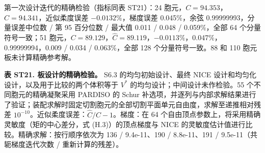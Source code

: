 \documentclass[preprint,12pt,authoryear]{elsarticle}
\begin{document}
第一次设计迭代的精确检验（指标同表 ST21）：24 胞元，\(C=94.353\)，\(\widehat C=94.341\)，近似柔度误差 \(-0.0132\%\)，梯度误差 0.045\%，余弦 0.99999993，分量误差中位数 / 第 95 百分位数 / 最大值 0.011 / 0.048 / 0.059\%，全部 64 个分量符号一致；51 胞元，\(C=89.129\)，\(\widehat C=89.119\)，\(-0.0113\%\)，0.047\%，0.99999994，0.009 / 0.034 / 0.063\%，全部 128 个分量符号一致。88 和 110 胞元板未计算精确参考解。

\textbf{表 ST21. 板设计的精确检验。} S6.3 的均匀初始设计、最终 NICE 设计和均匀化设计，以及用于比较的两个体积等于 \(V^*\) 的均匀设计；中间设计未作检验。55 个不同胞元的精确凝聚采用 PARDISO 的 Schur 补选项，并逐列与内部求解结果进行了验证；装配求解时固定切割胞元的全部切割平面单元自由度，求解至递推相对残差 \(10^{-10}\)。近似柔度误差：\(\widehat C/C-1\)。梯度：在 64 个自由顶点参数上，将采用精确灵敏度（矩的中心差分，式 (H.3)）的顶点梯度与 NICE 的灵敏度估计值进行比较。精确求解：按行顺序依次为 136 / 9.4e-11、190 / 8.8e-11、191 / 9.5e-11（共轭梯度迭代次数 / 重新计算的残差）。
\end{document}
